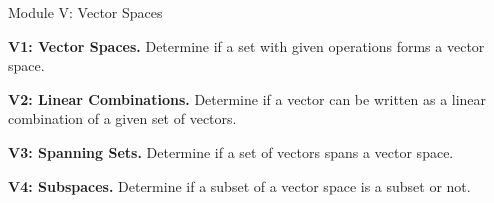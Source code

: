 
\begin{module}{Module V: Vector Spaces}

\begin{moduleStandards}
  \item \textbf{V1: Vector Spaces.}
        Determine if a set with given operations forms a vector space.
  \item \textbf{V2: Linear Combinations.}
        Determine if a vector can be written as a linear combination of
        a given set of vectors.
  \item \textbf{V3: Spanning Sets.}
        Determine if a set of vectors spans a vector space.
  \item \textbf{V4: Subspaces.}
        Determine if a subset of a vector space is a subset or not.
\end{moduleStandards}






\end{module}
